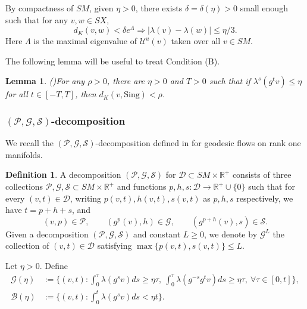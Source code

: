 \documentclass[11pt]{amsart}
\newtheorem{lemma}[theorem]{Lemma}
\theoremstyle{definition}
\newtheorem{definition}[theorem]{Definition}
\newcommand{\CCC}{\mathcal{C}}
\newcommand{\BBB}{\mathcal{B}}
\newcommand{\UUU}{\mathcal{U}}
\newcommand{\GGG}{\mathcal{G}}
\def\RR{{\mathbb R}}
\def\l{\lambda}   \def\L{\Lambda}
\begin{document}
By compactness of $SM$, given $\eta>0$, there exists $\delta=\delta(\eta)>0$ small enough such that for any $v,w\in SX$, 
\begin{equation}\label{smalldelta}
d_K(v,w)< \delta e^\Lambda \Rightarrow |\lambda(v)-\lambda(w)|\le \eta/3.    
\end{equation}
Here $\Lambda$ is the maximal eigenvalue of $\UUU^u(v)$ taken over all $v\in SM$. 

The following lemma will be useful to treat Condition (B).
\begin{lemma}(\cite[Proposition 3.4]{BCFT})\label{nhdsing}
For any $\rho>0$, there are $\eta>0$ and $T>0$ such that if $\l^s(g^tv)\le \eta$ for all $t\in [-T,T]$, then $d_K(v,\text{Sing})<\rho$. 
\end{lemma}

\subsubsection{$(\mathcal{P},\mathcal{G},\mathcal{S})$-decomposition}
We recall the $(\mathcal{P},\mathcal{G},\mathcal{S})$-decomposition defined in \cite{BCFT} for geodesic flows on rank one manifolds.
\begin{definition} \label{def:decomp}
A decomposition $(\mathcal{P},\mathcal{G},\mathcal{S})$ for $\mathcal{D}\subset SM\times \mathbb{R}^+$ consists of three collections $\mathcal{P},\mathcal{G},\mathcal{S} \subset SM\times \mathbb{R}^+$ and functions $p,h,s:\mathcal{D}\to \mathbb{R}^+\cup\{0\}$ such that for every $(v,t)\in \mathcal{D}$, writing $p(v,t), h(v,t), s(v,t)$ as $p,h,s$ respectively, we have $t=p+h+s$, and
$$(v,p)\in \mathcal{P}, \qquad (g^p(v),h)\in \mathcal{G}, \qquad (g^{p+h}(v),s)\in \mathcal{S}.$$
Given a decomposition $(\mathcal{P},\mathcal{G},\mathcal{S})$ and constant $L\geq 0$, we denote by $\mathcal{G}^L$ the collection of $(v,t)\in \mathcal{D}$ satisfying $\max\{p(v,t),s(v,t)\}\leq L$. %
\end{definition}
Let $\eta>0$. Define 
\begin{equation*}
    \begin{aligned}
\GGG(\eta)&:=\Big\{(v,t): \int_0^\tau \lambda(g^sv)ds \ge \eta\tau,\ \int_0^\tau \lambda(g^{-s}g^tv)ds \ge \eta\tau,\ \forall \tau \in [0,t]\Big\},\\
\BBB(\eta)&:=\Big\{(v,t): \int_0^t \lambda(g^sv)ds < \eta t\Big\}.
    \end{aligned}
\end{equation*}
\end{document}
